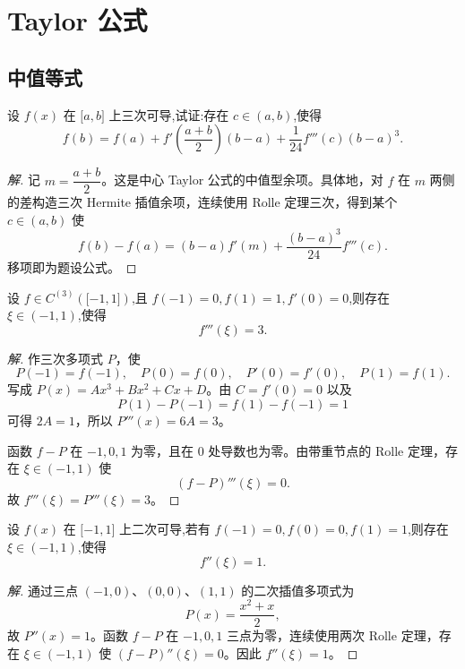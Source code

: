 \documentclass[../../数学分析培优讲义(答案版).tex]{subfiles}
\begin{document}
\newpage

\section{Taylor 公式}

\subsection{中值等式}

\begin{example}
设 $f(x)$ 在 $\lbrack a,b\rbrack$ 上三次可导,试证:存在 $c\in(a,b)$,使得
\[
    f(b)=f(a)+f'\left(\dfrac{a+b}{2}\right)(b-a)
    +\dfrac{1}{24}f'''(c)(b-a)^3.
\]
\end{example}

\begin{proof}[解]
记 $m=\dfrac{a+b}{2}$。这是中心 Taylor 公式的中值型余项。具体地，对 $f$ 在 $m$ 两侧的差构造三次 Hermite 插值余项，连续使用 Rolle 定理三次，得到某个 $c\in(a,b)$ 使
\[
    f(b)-f(a)
    =(b-a)f'(m)+\dfrac{(b-a)^3}{24}f'''(c).
\]
移项即为题设公式。
\end{proof}

\begin{example}
设 $f\in C^{(3)}(\lbrack -1,1\rbrack)$,且 $f(-1)=0,f(1)=1,f'(0)=0$,则存在 $\xi\in(-1,1)$,使得
\[
    f'''(\xi)=3.
\]
\end{example}

\begin{proof}[解]
作三次多项式 $P$，使
\[
    P(-1)=f(-1),
    \quad P(0)=f(0),
    \quad P'(0)=f'(0),
    \quad P(1)=f(1).
\]
写成 $P(x)=Ax^3+Bx^2+Cx+D$。由 $C=f'(0)=0$ 以及
\[
    P(1)-P(-1)=f(1)-f(-1)=1
\]
可得 $2A=1$，所以 $P'''(x)=6A=3$。

函数 $f-P$ 在 $-1,0,1$ 为零，且在 $0$ 处导数也为零。由带重节点的 Rolle 定理，存在 $\xi\in(-1,1)$ 使
\[
    (f-P)'''(\xi)=0.
\]
故 $f'''(\xi)=P'''(\xi)=3$。
\end{proof}

\begin{example}
设 $f(x)$ 在 $\lbrack -1,1\rbrack$ 上二次可导,若有 $f(-1)=0,f(0)=0,f(1)=1$,则存在 $\xi\in(-1,1)$,使得
\[
    f''(\xi)=1.
\]
\end{example}

\begin{proof}[解]
通过三点 $(-1,0)$、$(0,0)$、$(1,1)$ 的二次插值多项式为
\[
    P(x)=\dfrac{x^2+x}{2},
\]
故 $P''(x)=1$。函数 $f-P$ 在 $-1,0,1$ 三点为零，连续使用两次 Rolle 定理，存在 $\xi\in(-1,1)$ 使 $(f-P)''(\xi)=0$。因此 $f''(\xi)=1$。
\end{proof}
\end{document}
